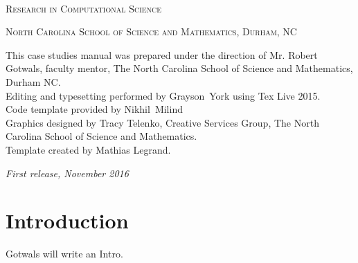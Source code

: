 \documentclass[11pt]{book} %
\begin{document}
\newpage
~\vfill
\thispagestyle{empty}

\noindent \textsc{Research in Computational Science}\medskip

\noindent \textsc{North Carolina School of Science and Mathematics, Durham, NC}\medskip %

\noindent This case studies manual was prepared under the direction of Mr. Robert Gotwals, faculty mentor, The North Carolina School of Science and Mathematics, Durham NC.\\
Editing and typesetting performed by Grayson~York using Tex Live 2015. \\
Code template provided by Nikhil~Milind\\
Graphics designed by Tracy Telenko, Creative Services Group, The North Carolina School of Science and Mathematics.\\
Template created by Mathias Legrand.\medskip   %

\noindent \textit{First release, November 2016} %

\pagestyle{empty} %
\tableofcontents %


\pagestyle{fancy} %


\chapter*{Introduction}
\vspace{1cm}

Gotwals will write an Intro.












\end{document}
